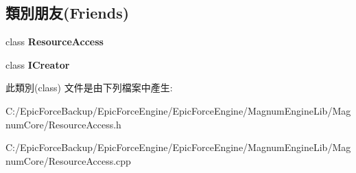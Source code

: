 \subsection*{類別朋友(Friends)}
\begin{DoxyCompactItemize}
\item 
class {\bfseries Resource\+Access}\hypertarget{class_magnum_1_1_resource_access_1_1_factory_a3a26a4a200b91c31f27b5e173018a17c}{}\label{class_magnum_1_1_resource_access_1_1_factory_a3a26a4a200b91c31f27b5e173018a17c}

\item 
class {\bfseries I\+Creator}\hypertarget{class_magnum_1_1_resource_access_1_1_factory_a6d6e56ac47edfce9d2590e0757222ded}{}\label{class_magnum_1_1_resource_access_1_1_factory_a6d6e56ac47edfce9d2590e0757222ded}

\end{DoxyCompactItemize}


此類別(class) 文件是由下列檔案中產生\+:\begin{DoxyCompactItemize}
\item 
C\+:/\+Epic\+Force\+Backup/\+Epic\+Force\+Engine/\+Epic\+Force\+Engine/\+Magnum\+Engine\+Lib/\+Magnum\+Core/Resource\+Access.\+h\item 
C\+:/\+Epic\+Force\+Backup/\+Epic\+Force\+Engine/\+Epic\+Force\+Engine/\+Magnum\+Engine\+Lib/\+Magnum\+Core/Resource\+Access.\+cpp\end{DoxyCompactItemize}
